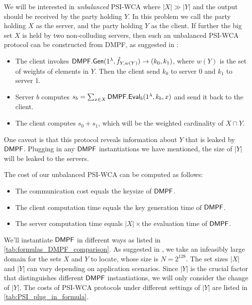 We will be interested in \emph{unbalanced} PSI-WCA where $|X|\gg |Y|$ and the output should be received by the party holding $Y$. In this problem we call the party holding $X$ as the server, and the party holding $Y$ as the client. If further the big set $X$ is held by two non-colluding servers, then such an unbalanced PSI-WCA protocol can be constructed from DMPF, as suggested in \cite{cryptoeprint:2020/1599}: 
\begin{itemize}
  \item The client invokes ${\sf DMPF}.{\sf Gen}(1^\lambda, \hat{f}_{Y,w(Y)})\rightarrow (k_0,k_1)$, where $w(Y)$ is the set of weights of elements in $Y$. Then the client send $k_0$ to server 0 and $k_1$ to server 1. 
  \item Server $b$ computes $s_b=\sum_{x\in X}{\sf DMPF}.{\sf Eval}_b(1^\lambda, k_b,x)$ and send it back to the client. 
  \item The client computes $s_0+s_1$, which will be the weighted cardinality of $X\cap Y$. 
\end{itemize}
One caveat is that this protocol reveals information about $Y$ that is leaked by ${\sf DMPF}$. Plugging in any ${\sf DMPF}$ instantiations we have mentioned, the size of $|Y|$ will be leaked to the servers. 

The cost of our unbalanced PSI-WCA can be computed as follows: 
\begin{itemize}
  \item The communication cost equals the keysize of ${\sf DMPF}$. 
  \item The client computation time equals the key generation time of ${\sf DMPF}$. 
  \item The server computation time equals $|X|\times$the evaluation time of ${\sf DMPF}$. 
\end{itemize}

We'll instantiate ${\sf DMPF}$ in different ways as listed in \cref{tab:formulas_DMPF_comparison}. As suggested in \cite{cryptoeprint:2020/1599}, we take an infeasibly large domain for the sets $X$ and $Y$ to locate, whose size is $N = 2^{128}$. The set sizes $|X|$ and $|Y|$ can vary depending on application scenarios. Since $|Y|$ is the crucial factor that distinguishes different ${\sf DMPF}$ instantiations, we will only consider the change of $|Y|$. The costs of PSI-WCA protocols under different settings of $|Y|$ are listed in \cref{tab:PSI_plug_in_formula}. 


